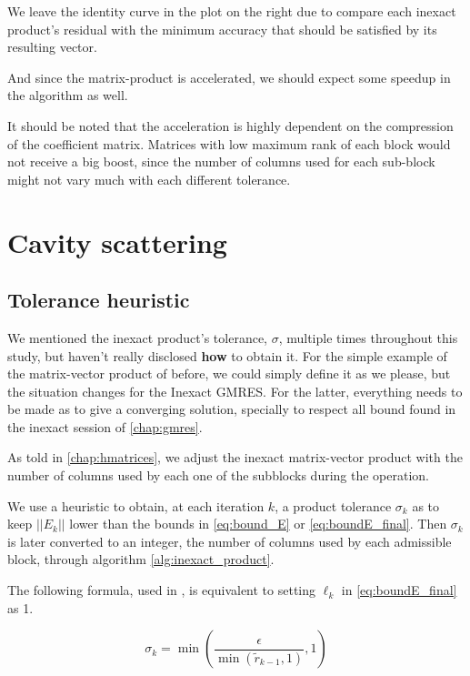 We leave the identity curve in the plot on the right due to compare each inexact product's residual with the minimum accuracy that should be satisfied by its resulting vector.

And since the matrix-product is accelerated, we should expect some speedup in the algorithm as well.

It should be noted that the acceleration is highly dependent on the compression of the coefficient matrix. Matrices with low maximum rank of each block would not receive a big boost, since the number of columns used for each sub-block might not vary much with each different tolerance.



\section{Cavity scattering}

\subsection{Tolerance heuristic}

We mentioned the inexact product's tolerance, $\sigma$, multiple times throughout this study, but haven't really disclosed \textbf{how} to obtain it. For the simple example of the matrix-vector product of before, we could simply define it as we please, but the situation changes for the Inexact GMRES. For the latter, everything needs to be made as to give a converging solution, specially to respect all bound found in the inexact session of \autoref{chap:gmres}.

As told in \autoref{chap:hmatrices}, we adjust the inexact matrix-vector product with the number of columns used by each one of the subblocks during the operation.

We use a heuristic to obtain, at each iteration $k$, a product tolerance $\sigma_{k}$ as to keep $||E_{k}||$ lower than the bounds in \autoref{eq:bound_E} or \autoref{eq:boundE_final}. Then $\sigma_{k}$ is later converted to an integer, the number of columns used by each admissible block, through algorithm \ref{alg:inexact_product}.

The following formula, used in \cite{wang2016inexactkryloviterationsrelaxation}, is equivalent to setting $\ell_{k}$ in \autoref{eq:boundE_final} as 1.

\begin{equation}
    \sigma_{k} = \min \left(\frac{\epsilon}{\min(\tilde{r}_{k-1},1)},1 \right)
\end{equation}

